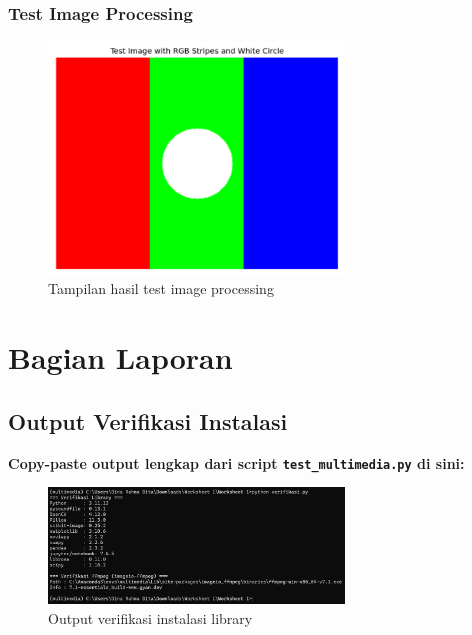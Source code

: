 \documentclass[11pt,a4paper]{article}
\begin{document}
\subsubsection{Test Image Processing}
\begin{figure}[H]
    \centering
    \includegraphics[width=0.7\textwidth]{Figure/ss/13.png}
    \caption{Tampilan hasil test image processing}
    \label{fig:image_processing}
\end{figure}

\section{Bagian Laporan}

\subsection{Output Verifikasi Instalasi}
\textbf{Copy-paste output lengkap dari script \texttt{test\_multimedia.py} di sini:}

\begin{figure}[H]
    \centering
    \includegraphics[width=0.7\textwidth]{Figure/ss/11.png}
    \caption{Output verifikasi instalasi library}
    \label{fig:verifikasi_library}
\end{figure}
\end{document}
